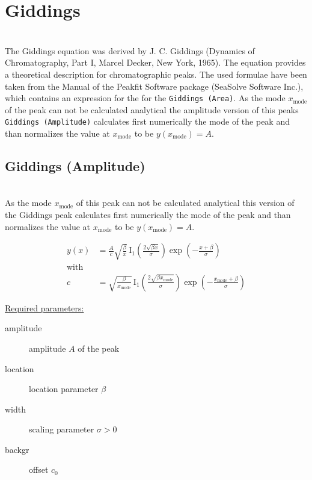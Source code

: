 \clearpage
\section{Giddings} ~\\
\label{sec:Giddings} The Giddings equation was derived by J. C.
Giddings (Dynamics of Chromatography, Part I, Marcel Decker, New
York, 1965). The equation provides a theoretical description for
chromatographic peaks. The used formulae have been taken from the
Manual of the Peakfit Software package (SeaSolve Software Inc.),
which contains an expression for the for the \texttt{Giddings
(Area)}. As the mode $x_\text{mode}$ of the peak can not be
calculated analytical the amplitude version of this peaks
\texttt{Giddings (Amplitude)} calculates first numerically the mode
of the peak and than normalizes the value at $x_\text{mode}$ to be
$y(x_\text{mode})=A$.

\clearpage
\subsection{Giddings (Amplitude)} ~\\
\label{sec:GiddingsAmplitude} As the mode $x_\text{mode}$ of this
peak can not be calculated analytical this version of the Giddings
peak calculates first numerically the mode of the peak and than
normalizes the value at $x_\text{mode}$ to be $y(x_\text{mode})=A$.

\begin{subequations}
\begin{align}
y(x) & = \frac{A}{c} \sqrt{\frac{\beta}{x}} \,
\mathrm{I}_1\left(\frac{2\sqrt{\beta x}}{\sigma}\right)
\exp\left(-\frac{x+\beta}{\sigma}\right) \\
\text{with } & \nonumber \\
c & = \sqrt{\frac{\beta}{x_\text{mode}}} \,
\mathrm{I}_1\left(\frac{2\sqrt{\beta x_\text{mode}}}{\sigma}\right)
\exp\left(-\frac{x_\text{mode}+\beta}{\sigma}\right)
\end{align}
\end{subequations}

\uline{Required parameters:}
\begin{description}
    \item[amplitude] amplitude $A$ of the peak
    \item[location] location parameter $\beta$
    \item[width] scaling parameter $\sigma > 0$
    \item[backgr] offset $c_0$
\end{description}

